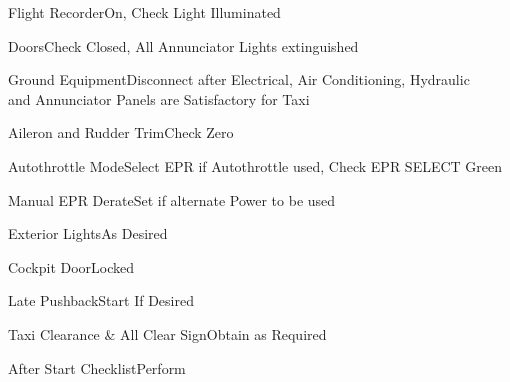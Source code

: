 \documentclass[sim-use, blue_items]{checklist}
\begin{document}
\begin{continuedchecklist}
	\item{Flight Recorder}{On, Check Light Illuminated}
	\item{Doors}{Check Closed, All Annunciator Lights extinguished}
	\item{Ground Equipment}{Disconnect after Electrical, Air Conditioning, Hydraulic\\and Annunciator Panels are Satisfactory for Taxi}
	\item{Aileron and Rudder Trim}{Check Zero}
	\item{Autothrottle Mode}{Select EPR if Autothrottle used, Check EPR SELECT Green}
	\item{Manual EPR Derate}{Set if alternate Power to be used}
	\item{Exterior Lights}{As Desired}
	\item{Cockpit Door}{Locked}
	\item{Late Pushback}{Start If Desired}
	\item{Taxi Clearance \& All Clear Sign}{Obtain as Required}
	\item{After Start Checklist}{Perform}
\end{continuedchecklist}
\end{document}
